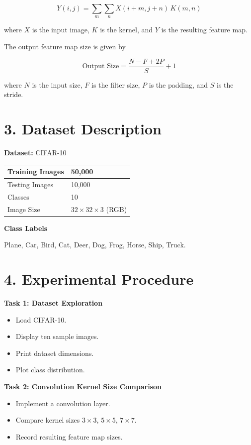 \documentclass[11pt]{article}
\begin{document}
\[
Y(i,j) = \sum_{m}\sum_{n} X(i+m, j+n)\,K(m,n)
\]

where $X$ is the input image, $K$ is the kernel, and $Y$ is the resulting feature map.

The output feature map size is given by

\[
\text{Output Size} = \frac{N - F + 2P}{S} + 1
\]

where $N$ is the input size, $F$ is the filter size, $P$ is the padding, and $S$ is the stride.


\section*{3. Dataset Description}

\textbf{Dataset:} CIFAR-10

\begin{center}
\begin{tabular}{|l|l|}
\hline
Training Images & 50,000\\
\hline
Testing Images & 10,000\\
\hline
Classes & 10\\
\hline
Image Size & $32 \times 32 \times 3$ (RGB)\\
\hline
\end{tabular}
\end{center}

\textbf{Class Labels}

Plane, Car, Bird, Cat, Deer, Dog, Frog, Horse, Ship, Truck.


\section*{4. Experimental Procedure}

\textbf{Task 1: Dataset Exploration}
\begin{itemize}
\item Load CIFAR-10.
\item Display ten sample images.
\item Print dataset dimensions.
\item Plot class distribution.
\end{itemize}

\bigskip

\textbf{Task 2: Convolution Kernel Size Comparison}
\begin{itemize}
\item Implement a convolution layer.
\item Compare kernel sizes $3\times3$, $5\times5$, $7\times7$.
\item Record resulting feature map sizes.
\end{itemize}
\end{document}
